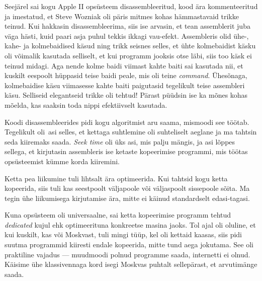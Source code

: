 Seejärel sai kogu Apple II opsüsteem disassembleeritud, kood ära 
kommenteeritud ja imestatud, et Steve Wozniak oli päris mitmes kohas
hämmastavaid trikke teinud. 
Kui hakkasin disassembleerima, siis ise arvasin, et tean assemblerit juba 
väga hästi, kuid paari asja puhul tekkis ikkagi 
vau-efekt. Assembleris olid ühe-, kahe- ja 
kolmebaidised käsud ning trikk seisnes selles, et ühte kolmebaidist käsku oli võimalik 
kasutada selliselt, et kui programm jooksis otse läbi, siis too 
käsk ei teinud midagi. Aga nende kolme baidi viimast 
kahte baiti sai kasutada nii, et kuskilt eespoolt hüppasid teise 
baidi peale, mis oli teine \emph{command}. Ühesõnaga, kolmebaidise käsu 
viimasesse kahte baiti paigutasid tegelikult teise assembleri käsu. Selliseid
elegantseid trikke oli tehtud! Pärast püüdsin ise ka mõnes kohas mõelda, 
kas saaksin toda nippi efektiivselt kasutada.


Koodi disassembleerides pidi kogu 
algoritmist aru saama, mismoodi see töötab. Tegelikult oli asi selles, 
et kettaga suhtlemine oli suhteliselt aeglane ja ma tahtsin seda kiiremaks saada. 
\emph{Seek time} oli üks asi, mis palju mängis, ja asi lõppes sellega, et 
kirjutasin assembleris ise ketaste kopeerimise programmi, mis 
töötas opsüsteemist kümme korda kiiremini. 


Ketta pea liikumine tuli lihtsalt ära optimeerida. Kui tahtsid kogu ketta 
kopeerida, siis tuli kas seestpoolt väljapoole või 
väljaspoolt sissepoole sõita. Ma tegin ühe liikumisega kirjutamise ära, 
mitte ei käinud standardselt edasi-tagasi.


Kuna opsüsteem oli universaalne, sai ketta 
kopeerimise programm tehtud \emph{dedicated} kujul ehk optimeerituna 
konkreetse masina jaoks. Tol ajal oli oluline, et kui kuskilt, kas või 
Moskvast, tuli mingi tüüp, kel oli kettaid kaasas, siis pidi 
suutma programmid kiiresti endale kopeerida, mitte tund aega jokutama. See oli praktiline vajadus --- muudmoodi polnud programme saada, internetti ei olnud. Käisime 
ühe klassivennaga kord isegi Moskvas puhtalt sellepärast, et arvutimänge saada.

